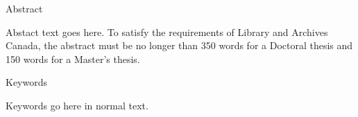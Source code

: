 \begin{center} \Large Abstract \end{center}

Abstact text goes here.
To satisfy the requirements of Library and Archives Canada, the abstract must be no longer than 350 words for a Doctoral thesis and 150 words for a Master's thesis.

{\Large Keywords}

Keywords go here in normal text.